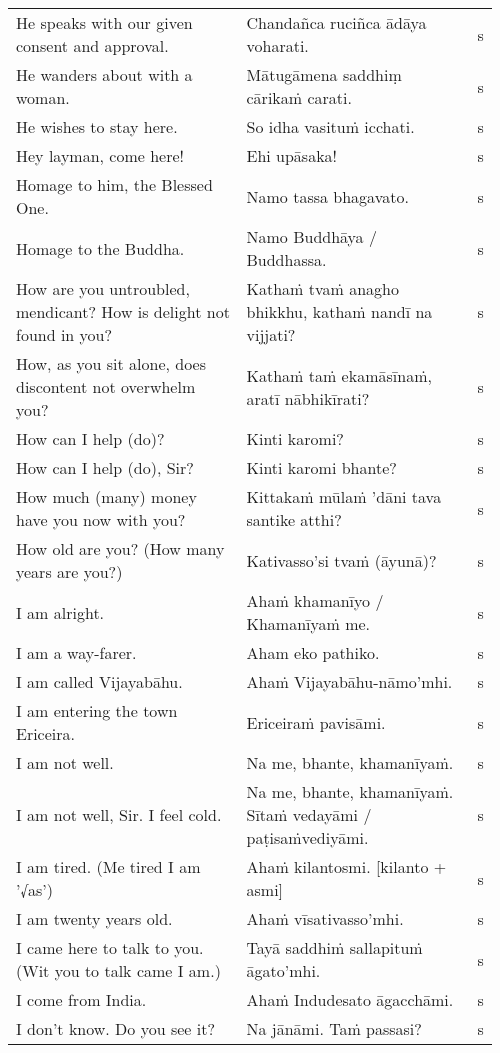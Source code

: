 \documentclass[a5paper]{memoir}
\begin{document}
\begin{longtable}{L{0.48\linewidth} L{0.48\linewidth} H}
He speaks with our given consent and approval. & Chandañca ruciñca ādāya voharati. & s\\[0pt]
He wanders about with a woman. & Mātugāmena saddhiṃ cārikaṁ carati. & s\\[0pt]
He wishes to stay here. & So idha vasituṁ icchati. & s\\[0pt]
Hey layman, come here! & Ehi upāsaka! & s\\[0pt]
Homage to him, the Blessed One. & Namo tassa bhagavato. & s\\[0pt]
Homage to the Buddha. & Namo Buddhāya / Buddhassa. & s\\[0pt]
How are you untroubled, mendicant? How is delight not found in you? & Kathaṁ tvaṁ anagho bhikkhu, kathaṁ nandī na vijjati? & s\\[0pt]
How, as you sit alone, does discontent not overwhelm you? & Kathaṁ taṁ ekamāsīnaṁ, aratī nābhikīrati? & s\\[0pt]
How can I help (do)? & Kinti karomi? & s\\[0pt]
How can I help (do), Sir? & Kinti karomi bhante? & s\\[0pt]
How much (many) money have you now with you? & Kittakaṁ mūlaṁ 'dāni tava santike atthi? & s\\[0pt]
How old are you? (How many years are you?) & Kativasso'si tvaṁ (āyunā)? & s\\[0pt]
I am alright. & Ahaṁ khamanīyo / Khamanīyaṁ me. & s\\[0pt]
I am a way-farer. & Aham eko pathiko. & s\\[0pt]
I am called Vijayabāhu. & Ahaṁ Vijayabāhu-nāmo'mhi. & s\\[0pt]
I am entering the town Ericeira. & Ericeiraṁ pavisāmi. & s\\[0pt]
I am not well. & Na me, bhante, khamanīyaṁ. & s\\[0pt]
I am not well, Sir. I feel cold. & Na me, bhante, khamanīyaṁ. Sītaṁ vedayāmi / paṭisaṁvediyāmi. & s\\[0pt]
I am tired. (Me tired I am '√as') & Ahaṁ kilantosmi. [kilanto + asmi] & s\\[0pt]
I am twenty years old. & Ahaṁ vīsativasso'mhi. & s\\[0pt]
I came here to talk to you. (Wit you to talk came I am.) & Tayā saddhiṁ sallapituṁ āgato'mhi. & s\\[0pt]
I come from India. & Ahaṁ Indudesato āgacchāmi. & s\\[0pt]
I don't know. Do you see it? & Na jānāmi. Taṁ passasi? & s\\[0pt]

\end{longtable}
\end{document}
